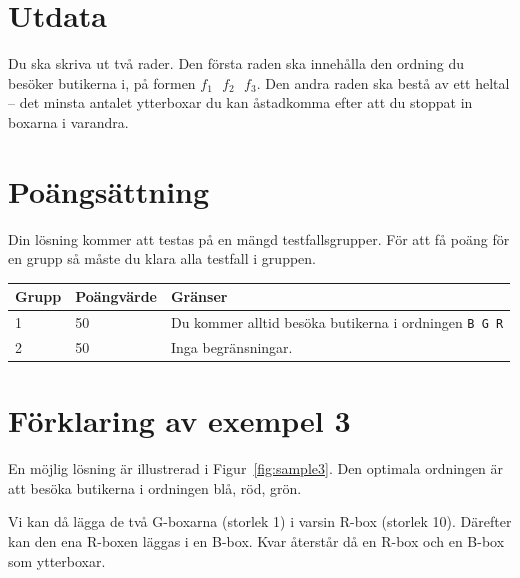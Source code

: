 \section*{Utdata}
Du ska skriva ut två rader.
Den första raden ska innehålla den ordning du besöker butikerna i, på formen $f_1\text{ }f_2\text{ }f_3$.
Den andra raden ska bestå av ett heltal -- det minsta antalet ytterboxar du kan åstadkomma efter att du stoppat in boxarna i varandra.

\section*{Poängsättning}
Din lösning kommer att testas på en mängd testfallsgrupper. För att få poäng för en grupp
så måste du klara alla testfall i gruppen.

\noindent
\begin{tabular}{| l | l | l |}
\hline
Grupp & Poängvärde & Gränser \\ \hline
1     & 50         & Du kommer alltid besöka butikerna i ordningen \texttt{B G R} \\ \hline
2     & 50         & Inga begränsningar. \\ \hline
\end{tabular}

\section*{Förklaring av exempel 3}
En möjlig lösning är illustrerad i Figur~\ref{fig:sample3}.
Den optimala ordningen är att besöka butikerna i ordningen blå, röd, grön.

Vi kan då lägga de två G-boxarna (storlek 1) i varsin R-box (storlek 10).
Därefter kan den ena R-boxen läggas i en B-box.
Kvar återstår då en R-box och en B-box som ytterboxar.
